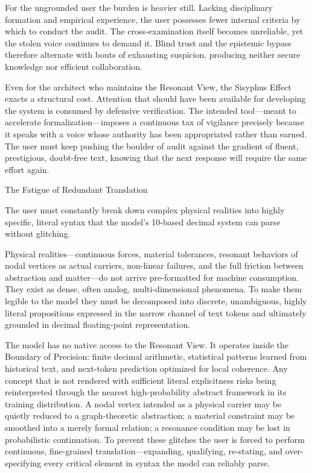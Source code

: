 For the ungrounded user the burden is heavier still. Lacking disciplinary formation and empirical experience, the user possesses fewer internal criteria by which to conduct the audit. The cross-examination itself becomes unreliable, yet the stolen voice continues to demand it. Blind trust and the epistemic bypass therefore alternate with bouts of exhausting suspicion, producing neither secure knowledge nor efficient collaboration.

Even for the architect who maintains the Resonant View, the Sisyphus Effect exacts a structural cost. Attention that should have been available for developing the system is consumed by defensive verification. The intended tool—meant to accelerate formalization—imposes a continuous tax of vigilance precisely because it speaks with a voice whose authority has been appropriated rather than earned. The user must keep pushing the boulder of audit against the gradient of fluent, prestigious, doubt-free text, knowing that the next response will require the same effort again.

The Fatigue of Redundant Translation

The user must constantly break down complex physical realities into highly specific, literal syntax that the model’s 10-based decimal system can parse without glitching.

Physical realities—continuous forces, material tolerances, resonant behaviors of nodal vertices as actual carriers, non-linear failures, and the full friction between abstraction and matter—do not arrive pre-formatted for machine consumption. They exist as dense, often analog, multi-dimensional phenomena. To make them legible to the model they must be decomposed into discrete, unambiguous, highly literal propositions expressed in the narrow channel of text tokens and ultimately grounded in decimal floating-point representation.

The model has no native access to the Resonant View. It operates inside the Boundary of Precision: finite decimal arithmetic, statistical patterns learned from historical text, and next-token prediction optimized for local coherence. Any concept that is not rendered with sufficient literal explicitness risks being reinterpreted through the nearest high-probability abstract framework in its training distribution. A nodal vertex intended as a physical carrier may be quietly reduced to a graph-theoretic abstraction; a material constraint may be smoothed into a merely formal relation; a resonance condition may be lost in probabilistic continuation. To prevent these glitches the user is forced to perform continuous, fine-grained translation—expanding, qualifying, re-stating, and over-specifying every critical element in syntax the model can reliably parse.


